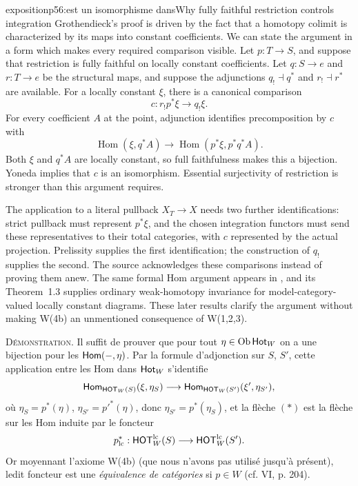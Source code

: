 \begin{dcomment}{exposition}{p56:est un isomorphisme dans}{Why fully faithful restriction controls integration}
Grothendieck's proof is driven by the fact that a homotopy colimit is characterized by its maps into constant coefficients. We can state the argument in a form which makes every required comparison visible. Let $p:T\to S$, and suppose that restriction is fully faithful on locally constant coefficients. Let $q:S\to e$ and $r:T\to e$ be the structural maps, and suppose the adjunctions $q_!\dashv q^*$ and $r_!\dashv r^*$ are available. For a locally constant $\xi$, there is a canonical comparison
\[
 c:r_!p^*\xi\longrightarrow q_!\xi.
\]
For every coefficient $A$ at the point, adjunction identifies precomposition by $c$ with
\[
 \operatorname{Hom}(\xi,q^*A)
 \longrightarrow
 \operatorname{Hom}(p^*\xi,p^*q^*A).
\]
Both $\xi$ and $q^*A$ are locally constant, so full faithfulness makes this a bijection. Yoneda implies that $c$ is an isomorphism. Essential surjectivity of restriction is stronger than this argument requires.

The application to a literal pullback $X_T\to X$ needs two further identifications: strict pullback must represent $p^*\xi$, and the chosen integration functors must send these representatives to their total categories, with $c$ represented by the actual projection. Prelissity supplies the first identification; the construction of $q_!$ supplies the second. The source acknowledges these comparisons instead of proving them anew. The same formal Hom argument appears in \citet[Proposition~1.10]{Cisinski2009LocallyConstant}, and its Theorem~1.3 supplies ordinary weak-homotopy invariance for model-category-valued locally constant diagrams. These later results clarify the argument without making W(4b) an unmentioned consequence of W(1,2,3).
\end{dcomment}


\textsc{Démonstration}. Il suffit de prouver que pour tout $\eta \in \mathrm{Ob}\,\mathsf{Hot}_W$ on a une bijection pour les $\mathsf{Hom}(-,\eta)$. Par la formule d'adjonction sur $S$, $S'$, cette application entre les Hom dans $\mathsf{Hot}_W$ s'identifie
\[
\mathsf{Hom}_{\mathsf{HOT}_W(S)}(\xi,\eta_S) \longrightarrow \mathsf{Hom}_{\mathsf{HOT}_W(S')}(\xi',\eta_{S'}),
\]
où $\eta_S = p^*(\eta)$, $\eta_{S'} = p'^*(\eta)$, donc $\eta_{S'} = p^*(\eta_S)$, et la flèche $(*)$ est la flèche sur les Hom induite par le foncteur
\[
p^*_{\mathrm{lc}} : \mathsf{HOT}^{\mathrm{lc}}_W(S) \longrightarrow \mathsf{HOT}^{\mathrm{lc}}_W(S').
\]
Or moyennant l'axiome W(4b) (que nous n'avons pas utilisé jusqu'à présent), ledit foncteur est une \textit{équivalence de catégories} si $p \in W$ (cf. VI, p. 204).

